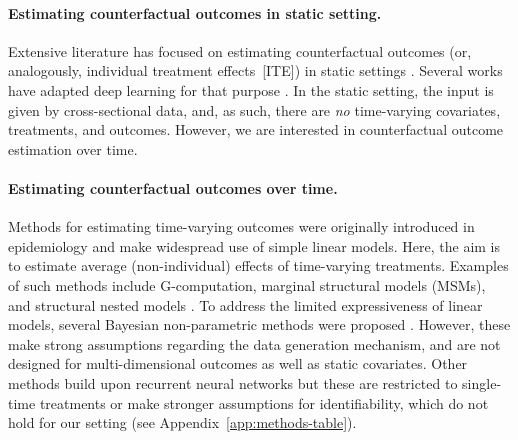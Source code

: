 \documentclass{article}
\theoremstyle{plain}
\theoremstyle{definition}
\theoremstyle{remark}
\begin{document}
\paragraph{Estimating counterfactual outcomes in static setting.} 

Extensive literature has focused on estimating counterfactual outcomes (or, analogously, individual treatment effects~[ITE]) in static settings \cite{johansson2016learning,alaa2018bayesian,wager2018estimation,yoon2018ganite,curth2021nonparametric}. Several works have adapted deep learning for that purpose \cite{johansson2016learning,yoon2018ganite}. In the static setting, the input is given by cross-sectional data, and, as such, there are \emph{no} time-varying covariates, treatments, and outcomes. However, we are interested in counterfactual outcome estimation over time. 

\paragraph{Estimating counterfactual outcomes over time.} Methods for estimating time-varying outcomes were originally introduced in epidemiology and make widespread use of simple linear models. Here,  the aim is to estimate average (non-individual) effects of time-varying treatments. Examples of such methods include G-computation, marginal structural models (MSMs), and structural nested models \cite{robins1986new,robins2000marginal,hernan2001marginal,robins2009estimation}. To address the limited expressiveness of linear models, several Bayesian non-parametric methods were proposed \cite{Xu16,schulam2017reliable,soleimani2017treatment}. However, these make strong assumptions regarding the data generation mechanism, and are not designed for multi-dimensional outcomes as well as static covariates. Other methods build upon recurrent neural networks  \cite{qian2021synctwin,berrevoets2021disentangled} but these are restricted to single-time treatments or make stronger assumptions for identifiability, which do not hold for our setting (see Appendix~\ref{app:methods-table}). 
\end{document}
